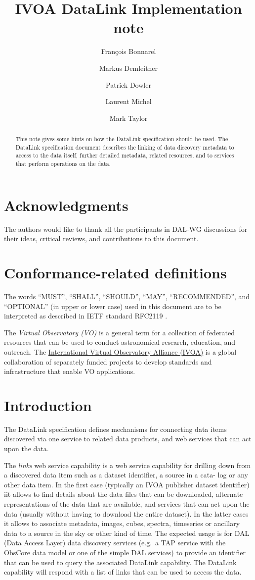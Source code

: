 \documentclass[11pt,a4paper]{ivoa}
\title{IVOA DataLink Implementation note}
\author[http://www.ivoa.net/twiki/bin/view/IVOA/FrancoisBonnarel]
       {Fran\c{c}ois Bonnarel}
\author[http://www.ivoa.net/twiki/bin/view/IVOA/MarkusDemleitner]
       {Markus Demleitner}
\author[http://www.ivoa.net/twiki/bin/view/IVOA/PatrickDowler]
       {Patrick Dowler}
\author[http://www.ivoa.net/twiki/bin/view/IVOA/LaurentMichel]
       {Laurent Michel}
\author[http://www.ivoa.net/twiki/bin/view/IVOA/MarkTaylor]
       {Mark Taylor}
\begin{document}
\begin{abstract}
This note gives some hints on how the DataLink specification should be used.
The DataLink specification document \citep{std:DataLink} describes the linking of data discovery metadata
to access to the data itself, further detailed metadata, related
resources, and to services that perform operations on the data. 
\end{abstract}


\section*{Acknowledgments}

The authors would like to thank all the participants in DAL-WG discussions
for their ideas, critical reviews, and contributions to this document.


\section*{Conformance-related definitions}

The words ``MUST'', ``SHALL'', ``SHOULD'', ``MAY'', ``RECOMMENDED'', and
``OPTIONAL'' (in upper or lower case) used in this document are to be
interpreted as described in IETF standard RFC2119 \citep{std:RFC2119}.

The \emph{Virtual Observatory (VO)} is a
general term for a collection of federated resources that can be used
to conduct astronomical research, education, and outreach.
The \href{http://www.ivoa.net}{International
Virtual Observatory Alliance (IVOA)} is a global
collaboration of separately funded projects to develop standards and
infrastructure that enable VO applications.


\section{Introduction}

The DataLink  specification \citep{std:DataLink} defines mechanisms for connecting data items discovered
via one service to  related data products, and web services
that can act upon the data.

The {\em links\/} web service capability is a web service capability
for drilling
down from a discovered data item such as  a dataset identifier, a source in a cata-
log or any other data item. In the first case (typically an IVOA publisher
dataset identifier) iit allows to find details about the data files that can be
downloaded, alternate representations of the data that are available, and
services that can act upon the data (usually without having to download
the entire dataset). In the latter cases it allows to associate metadata, images,
cubes, spectra, timeseries or ancillary data to a source in the sky or other
kind of time. The expected usage is for DAL (Data Access Layer)
data discovery services (e.g.\ a TAP service \citep{2010ivoa.spec.0327D}
with the ObsCore \citep{2017ivoa.spec.0509L} data
model or one of the simple DAL services) to provide an identifier that
can be used to query the associated DataLink capability. The DataLink
capability will respond with a list of links that can be used to access
the data. 
\end{document}
